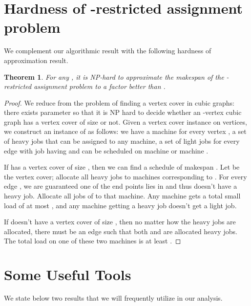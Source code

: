 \documentclass[11pt]{article}
\newtheorem{theorem}{Theorem} \newtheorem{lemma}{Lemma}[section]
\begin{document}
\section{Hardness of \texorpdfstring{}{(1,epsilon)}-restricted assignment problem}
\label{app:hardness}
We complement our algorithmic result with the following hardness of approximation result.

\begin{theorem}\label{thm:3}
For any , 
it is NP-hard to approximate the makespan of the -restricted assignment problem to a factor better than .
\end{theorem}
\begin{proof}
We reduce from the problem of finding a vertex cover in cubic graphs: there exists parameter  so that it is NP hard to decide whether an -vertex cubic graph has a vertex cover of size  or not.
Given a vertex cover instance  on  vertices, we construct an instance of  as follows: we have a machine for every vertex , a set of  heavy jobs that can be assigned to any machine,
a set of  light jobs  for every edge  with job  having
 and can be scheduled on machine  or machine .

If  has a vertex cover of size , then we can find a schedule of makespan . 
Let  be the vertex cover; allocate all heavy jobs to machines corresponding to . For every edge , we are guaranteed one of the end points lies in  and thus doesn't have a heavy job. Allocate all jobs of  to that machine. Any machine gets a total small load of at most , and any machine getting a heavy job doesn't get a light job. 

If  doesn't have a vertex cover of size , then no matter how the heavy jobs are allocated, there must be an edge  such that both  and  are allocated heavy jobs. The total load on one of these two machines is at least .
\end{proof}

\section{Some Useful Tools}\label{app:useful-tools}
We state below two results that we will frequently utilize in our analysis. 
\end{document}
